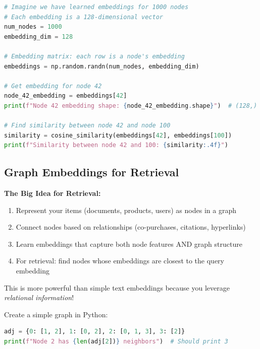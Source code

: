 \documentclass[12pt,a4paper]{article}
\begin{document}
\begin{lstlisting}[language=Python,caption={Conceptual embedding lookup}]
# Imagine we have learned embeddings for 1000 nodes
# Each embedding is a 128-dimensional vector
num_nodes = 1000
embedding_dim = 128

# Embedding matrix: each row is a node's embedding
embeddings = np.random.randn(num_nodes, embedding_dim)

# Get embedding for node 42
node_42_embedding = embeddings[42]
print(f"Node 42 embedding shape: {node_42_embedding.shape}")  # (128,)

# Find similarity between node 42 and node 100
similarity = cosine_similarity(embeddings[42], embeddings[100])
print(f"Similarity between node 42 and 100: {similarity:.4f}")
\end{lstlisting}

\subsection{Graph Embeddings for Retrieval}

\begin{concept}
\textbf{The Big Idea for Retrieval:}

\begin{enumerate}
    \item Represent your items (documents, products, users) as nodes in a graph
    \item Connect nodes based on relationships (co-purchases, citations, hyperlinks)
    \item Learn embeddings that capture both node features AND graph structure
    \item For retrieval: find nodes whose embeddings are closest to the query embedding
\end{enumerate}

This is more powerful than simple text embeddings because you leverage \textit{relational information}!
\end{concept}

\begin{checkpoint}
Create a simple graph in Python:
\begin{lstlisting}[language=Python]
adj = {0: [1, 2], 1: [0, 2], 2: [0, 1, 3], 3: [2]}
print(f"Node 2 has {len(adj[2])} neighbors")  # Should print 3
\end{lstlisting}
\end{checkpoint}

\end{document}
